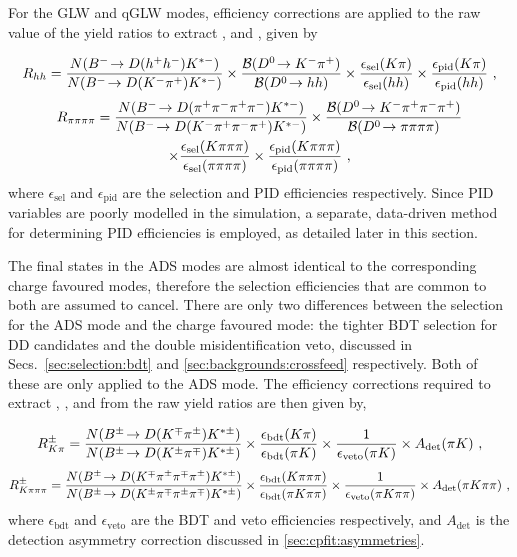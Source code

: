 For the GLW and qGLW modes, efficiency corrections are applied to the raw value of the yield ratios to extract \Rkk, \Rpipi and \Rpipipipi, given by 

{\footnotesize
\begin{equation}
R_{hh} = \frac{N({{{B}^-}}\!\rightarrow {\ensuremath{D}}(h^+h^-){{K}^{*-}})}{N({{{B}^-}}\!\rightarrow {\ensuremath{D}}({{K}^-}{{\pi}^+}){{K}^{*-}})} \times \frac{{\mathcal{B}}({{D}^0}\!\rightarrow {\ensuremath{{K}^-}}{\ensuremath{{\pi}^+}})}{{\mathcal{B}}({{D}^0}\!\rightarrow hh)} \times \frac{\epsilon_{\text{sel}}(K\pi)}{\epsilon_{\text{sel}}(hh)} \times \frac{\epsilon_{\text{pid}}(K\pi)}{\epsilon_{\text{pid}}(hh)} \text{ ,}
\label{effcorrectionglw2body}
\end{equation}
\begin{multline}
R_{\pi\pi\pi\pi} = \frac{N({{{B}^-}}\!\rightarrow {\ensuremath{D}}({{\pi}^+}{{\pi}^-}{{\pi}^+}{{\pi}^-}){{K}^{*-}})}{N({{{B}^-}}\!\rightarrow {\ensuremath{D}}({{K}^-}{{\pi}^+}{{\pi}^-}{{\pi}^+}){{K}^{*-}})} \times \frac{{\mathcal{B}}({{D}^0}\!\rightarrow {\ensuremath{{K}^-}}{\ensuremath{{\pi}^+}}{\ensuremath{{\pi}^-}}{\ensuremath{{\pi}^+}})}{{\mathcal{B}}({{D}^0}\!\rightarrow \pi\pi\pi\pi)} \\ \times \frac{\epsilon_{\text{sel}}(K\pi\pi\pi)}{\epsilon_{\text{sel}}(\pi\pi\pi\pi)} \times \frac{\epsilon_{\text{pid}}(K\pi\pi\pi)}{\epsilon_{\text{pid}}(\pi\pi\pi\pi)} \text{ ,}
\label{effcorrectionglw4body}
\end{multline}}%
where $\epsilon_{\text{sel}}$ and $\epsilon_{\text{pid}}$ are the selection and PID efficiencies respectively. Since PID variables are poorly modelled in the \lhcb simulation, a separate, data-driven method for determining PID efficiencies is employed, as detailed later in this section.

The final states in the ADS modes are almost identical to the corresponding charge favoured modes, therefore the selection efficiencies that are common to both are assumed to cancel. There are only two differences between the selection for the ADS mode and the charge favoured mode: the tighter BDT selection for DD candidates and the double misidentification veto, discussed in Secs.~\ref{sec:selection:bdt} and \ref{sec:backgrounds:crossfeed} respectively. Both of these are only applied to the ADS mode. The efficiency corrections required to extract \Rptwo, \Rmtwo, \Rpfour and \Rmfour from the raw yield ratios are then given by, 

{\footnotesize
\begin{equation}
R^{\pm}_{K\pi} = \frac{N({{B}^\pm}\!\rightarrow {\ensuremath{D}}({{K}^\mp}{{\pi}^\pm}){{K}^{*\pm}})}{N({{B}^\pm}\!\rightarrow {\ensuremath{D}}({{K}^\pm}{{\pi}^\mp}){{K}^{*\pm}})} \times \frac{\epsilon_{\text{bdt}}(K\pi)}{\epsilon_{\text{bdt}}(\pi K)} \times \frac{1}{\epsilon_{\text{veto}}(\pi K)} \times A_{\text{det}}(\pi K) \text{ ,}
\label{effcorrectionads2body}
\end{equation}
\begin{equation}
R^{\pm}_{K\pi\pi\pi} = \frac{N({{B}^\pm}\!\rightarrow {\ensuremath{D}}({{K}^\mp}{{\pi}^\pm}{{\pi}^\mp}{{\pi}^\pm}){{K}^{*\pm}})}{N({{B}^\pm}\!\rightarrow {\ensuremath{D}}({{K}^\pm}{{\pi}^\mp}{{\pi}^\pm}{{\pi}^\mp}){{K}^{*\pm}})} \times \frac{\epsilon_{\text{bdt}}(K\pi\pi\pi)}{\epsilon_{\text{bdt}}(\pi K\pi\pi)} \times \frac{1}{\epsilon_{\text{veto}}(\pi K\pi\pi)} \times A_{\text{det}}(\pi K\pi\pi) \text{ ,}
\label{effcorrectionads4body}
\end{equation}}
where $\epsilon_{\text{bdt}}$ and $\epsilon_{\text{veto}}$ are the BDT and veto efficiencies respectively, and $A_{\text{det}}$ is the detection asymmetry correction discussed in \sect\ref{sec:cpfit:asymmetries}.

